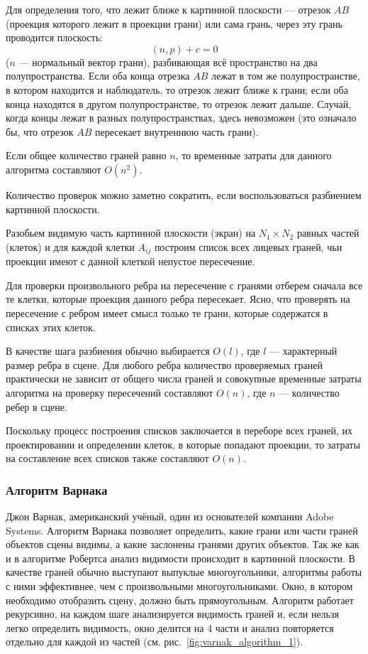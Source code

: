 Для определения того, что лежит ближе к картинной плоскости — отрезок \( AB \) (проекция которого лежит в проекции грани) или сама грань, через эту грань проводится плоскость:
\begin{equation}
(n, p) + c = 0
\end{equation}
(\( n \) — нормальный вектор грани), разбивающая всё пространство на два полупространства. Если оба конца отрезка \( AB \) лежат в том же полупространстве, в котором находится и наблюдатель, то отрезок лежит ближе к грани; если оба конца находятся в другом полупространстве, то отрезок лежит дальше. Случай, когда концы лежат в разных полупространствах, здесь невозможен (это означало бы, что отрезок \( AB \) пересекает внутреннюю часть грани).

Если общее количество граней равно \( n \), то временные затраты для данного алгоритма составляют \( O(n^2) \).

Количество проверок можно заметно сократить, если воспользоваться разбиением картинной плоскости.

Разобьем видимую часть картинной плоскости (экран) на \( N_1 \times N_2 \) равных частей (клеток) и для каждой клетки \( A_{ij} \) построим список всех лицевых граней, чьи проекции имеют с данной клеткой непустое пересечение.

Для проверки произвольного ребра на пересечение с гранями отберем сначала все те клетки, которые проекция данного ребра пересекает. Ясно, что проверять на пересечение с ребром имеет смысл только те грани, которые содержатся в списках этих клеток.

В качестве шага разбиения обычно выбирается \( O(l) \), где \( l \) — характерный размер ребра в сцене. Для любого ребра количество проверяемых граней практически не зависит от общего числа граней и совокупные временные затраты алгоритма на проверку пересечений составляют \( O(n) \), где \( n \) — количество ребер в сцене.

Поскольку процесс построения списков заключается в переборе всех граней, их проектировании и определении клеток, в которые попадают проекции, то затраты на составление всех списков также составляют \( O(n) \).~\cite{shishkin}




\subsubsection{Алгоритм Варнака}

\hspace{1.25cm}
Джон Варнак, американский учёный, один из основателей компании
Adobe Systems. Алгоритм Варнака позволяет определить, какие грани или части граней объектов сцены видимы, а какие заслонены гранями
других объектов. Так же как и в алгоритме Робертса анализ видимости
происходит в картинной плоскости. В качестве граней обычно выступают
выпуклые многоугольники, алгоритмы работы с ними эффективнее, чем с
произвольными многоугольниками. Окно, в котором необходимо отобразить сцену, должно быть прямоугольным. Алгоритм работает рекурсивно, на каждом шаге анализируется видимость граней и, если нельзя легко определить видимость, окно делится на 4 части и анализ повторяется отдельно для каждой из частей (см. рис.~\ref{fig:varnak_algorithm_1}).

